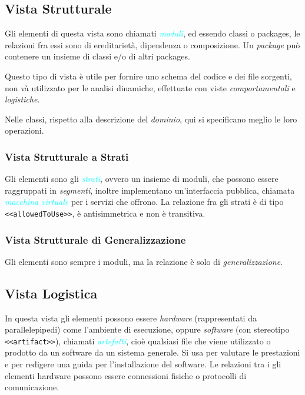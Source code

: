 \subsection{Vista Strutturale}

Gli elementi di questa vista sono chiamati \emph{\textcolor{cyan}{moduli}}, ed essendo
classi o packages, le relazioni fra essi sono di ereditarietà, dipendenza o composizione.
Un \emph{package} può contenere un insieme di classi e/o di altri packages.

Questo tipo di vista è utile per fornire uno schema del codice e dei file sorgenti, non và utilizzato per le analisi dinamiche,
effettuate con viste \emph{comportamentali} e \emph{logistiche}.

Nelle classi, rispetto alla descrizione del \emph{dominio}, qui si specificano meglio
le loro operazioni.

\subsubsection{Vista Strutturale a Strati}

Gli elementi sono gli \emph{\textcolor{cyan}{strati}}, ovvero un insieme di moduli, che possono essere
raggruppati in \emph{segmenti}, inoltre implementano un'interfaccia pubblica, chiamata \emph{\textcolor{cyan}{macchina virtuale}} per i servizi che offrono.
La relazione fra gli strati è di tipo \verb|<<allowedToUse>>|, è antisimmetrica e non è transitiva.

\subsubsection{Vista Strutturale di Generalizzazione}

Gli elementi sono sempre i moduli, ma la relazione è solo di \emph{generalizzazione}.

\subsection{Vista Logistica}

In questa vista gli elementi possono essere \emph{hardware} (rappresentati da parallelepipedi) come l'ambiente di esecuzione, oppure
\emph{software} (con stereotipo \verb|<<artifact>>|), chiamati \emph{\textcolor{cyan}{artefatti}}, cioè qualsiasi file che viene utilizzato o prodotto
da un software da un sistema generale. Si usa per valutare le prestazioni e per redigere
una guida per l'installazione del software. Le relazioni tra i gli elementi hardware possono essere
connessioni fisiche o protocolli di comunicazione.

